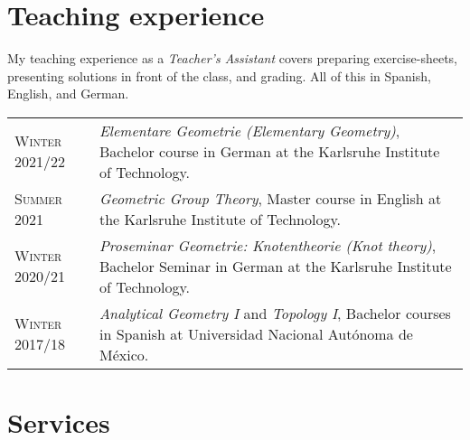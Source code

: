\documentclass[a4paper,11pt]{article} %
\begin{document}

\section{Teaching experience}

\begin{minipage}{15cm}
My teaching experience as a \emph{Teacher's Assistant} covers preparing exercise-sheets, presenting solutions in front of the class, and grading. All of this in Spanish, English, and German.
\end{minipage}

\begin{longtable}{>{\raggedleft\arraybackslash}p{4.2cm}p{10cm}}

    \textsc{Winter 2021/22} & \emph{Elementare Geometrie (Elementary Geometry)}, Bachelor course in German at the Karlsruhe Institute of Technology. \\

    \textsc{Summer 2021} & \emph{Geometric Group Theory}, Master course in English at the Karlsruhe Institute of Technology.\\

    \textsc{Winter 2020/21} & \emph{Proseminar Geometrie: Knotentheorie (Knot theory)}, Bachelor Seminar in German at the Karlsruhe Institute of Technology.\\

    \textsc{Winter 2017/18} & \emph{Analytical Geometry I} and \emph{Topology I}, Bachelor courses in Spanish at Universidad Nacional Autónoma de México.\\
    
\end{longtable}

	
\section{Services}
\end{document}
